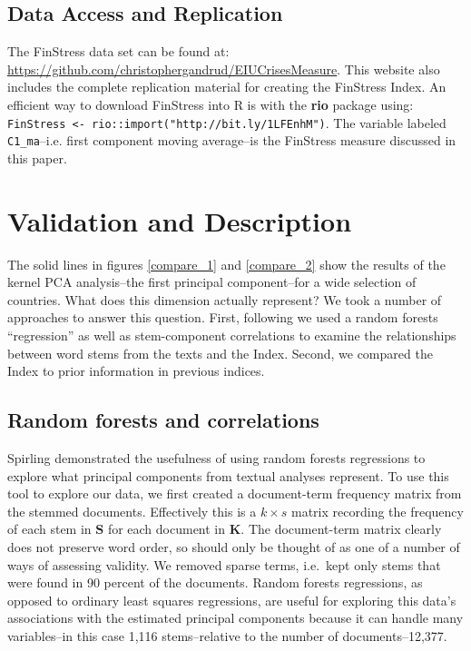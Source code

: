 \documentclass[]{article}
\begin{document}
\subsection{Data Access and Replication}

The FinStress data set can be found at:
\url{https://github.com/christophergandrud/EIUCrisesMeasure}. This website also includes the complete replication material for creating the FinStress Index. An efficient way to download FinStress into R is with the \textbf{rio} package using: \texttt{FinStress <- rio::import("http://bit.ly/1LFEnhM")}. The variable labeled \texttt{C1\_ma}--i.e. first component moving average--is the FinStress measure discussed in this paper.

\section{Validation and Description}\label{results}

The solid lines in figures \ref{compare_1} and \ref{compare_2} show the results of the kernel PCA analysis--the first principal component--for a wide selection of countries. What does this dimension actually represent? We took a number of approaches to answer this question. First, following \cite{Spirling2012} we used a random forests ``regression'' \citep{Breiman2001,jones2015} as well as stem-component correlations to examine the relationships between word stems from the texts and the Index. Second, we compared the Index to prior information in previous indices.

\subsection{Random forests and correlations}\label{random-forests}

Spirling \citeyearpar[88-90]{Spirling2012} demonstrated the usefulness of using random forests regressions to explore what principal components from textual analyses represent. To use this tool to explore our data, we first created a document-term frequency matrix from the stemmed documents. Effectively this is a \(k \times s\) matrix recording the frequency of each stem in \(\bm{S}\) for each document in \(\bm{K}\). The document-term matrix clearly does not preserve word order, so should only be thought of as one of a number of ways of assessing validity. We removed sparse terms, i.e.~kept only stems that were found in 90 percent of the documents. Random forests regressions, as opposed to ordinary least squares regressions, are useful for exploring this data's associations with the estimated principal components because it can handle many variables--in this case 1,116 stems--relative to the number of documents--12,377.
\end{document}

